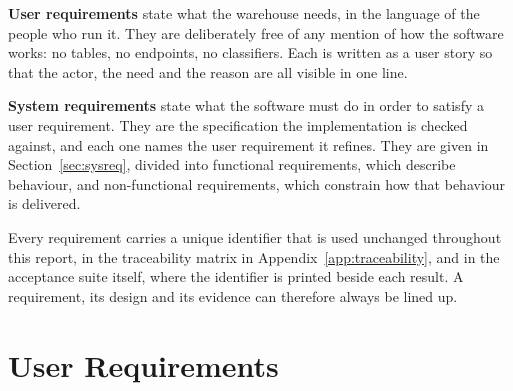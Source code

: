 \documentclass[12pt,a4paper]{report}
\begin{document}
\textbf{User requirements} state what the warehouse needs, in the language of the people who run
it. They are deliberately free of any mention of how the software works: no tables, no endpoints,
no classifiers. Each is written as a user story so that the actor, the need and the reason are all
visible in one line.

\textbf{System requirements} state what the software must do in order to satisfy a user
requirement. They are the specification the implementation is checked against, and each one names
the user requirement it refines. They are given in Section~\ref{sec:sysreq}, divided into
functional requirements, which describe behaviour, and non-functional requirements, which constrain
how that behaviour is delivered.

Every requirement carries a unique identifier that is used unchanged throughout this report, in the
traceability matrix in Appendix~\ref{app:traceability}, and in the acceptance suite itself, where
the identifier is printed beside each result. A requirement, its design and its evidence can
therefore always be lined up.

\section{User Requirements}
\end{document}
